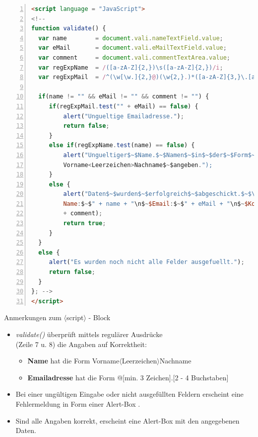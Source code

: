 \tiny{
\begin{lstlisting}[language = HTML,
				   mathescape = true, 
                   morekeywords = {onsubmit, onclick, this, return, function, if, else}, 
                   numbers = left, 
                   numbersep = 3pt]
<script language = "JavaScript">
<!--
function validate() {
  var name        = document.vali.nameTextField.value;
  var eMail       = document.vali.eMailTextField.value;
  var comment     = document.vali.commentTextArea.value;
  var regExpName  = /([a-zA-Z]{2,})\s([a-zA-Z]{2,})/i;
  var regExpMail  = /^(\w[\w.]{2,}@)(\w{2,}.)*([a-zA-Z]{3,}\.[a-zA-Z]{2,4})/$\$$i;
	
  if(name != "" && eMail != "" && comment != "") {
	 if(regExpMail.test("" + eMail) == false) {
		 alert("Ungueltige Emailadresse.");
		 return false;
	 }
	 else if(regExpName.test(name) == false) {
		 alert("Ungueltiger$~$Name.$~$Namen$~$in$~$der$~$Form$~$\n$~$
		 Vorname<Leerzeichen>Nachname$~$angeben.");
	 }	
	 else { 
		 alert("Daten$~$wurden$~$erfolgreich$~$abgeschickt.$~$\n$~$Ihre$~$Daten:$~$\n$~$
		 Name:$~$" + name + "\n$~$Email:$~$" + eMail + "\n$~$Kommentar:$~$" 
		 + comment);	
		 return true;	
	 }
  }
  else {
	 alert("Es wurden noch nicht alle Felder ausgefuellt.");
	 return false;
  }
}; -->
</script>
\end{lstlisting}}

\begin{frame}{Anmerkungen zum $\langle$script$\rangle$ - Block}
\small{
\begin{itemize}
\item {\it validate()} überprüft mittels regulärer Ausdrücke\\ (Zeile 7 u. 8) die Angaben auf Korrektheit:
	\begin{itemize}
	\item {\bf Name} hat die Form Vorname$\langle$Leerzeichen$\rangle$Nachname
	\item {\bf Emailadresse} hat die Form @[min. 3 Zeichen].[2 - 4 Buchstaben]
	\end{itemize}
\item Bei einer ungültigen Eingabe oder nicht ausgefüllten Feldern erscheint eine Fehlermeldung in Form einer Alert-Box .
\item Sind alle Angaben korrekt, erscheint eine Alert-Box mit den angegebenen Daten.
\end{itemize}}
\end{frame}
